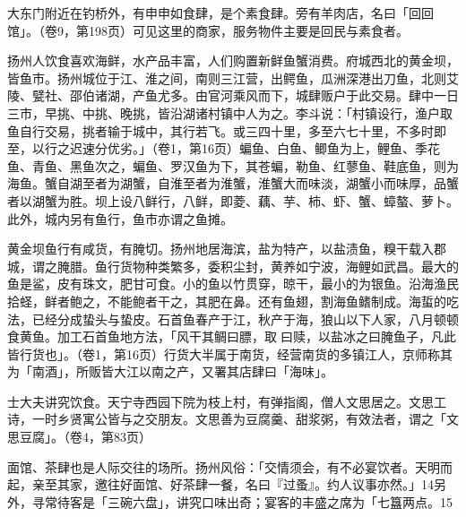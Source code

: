 大东门附近在钓桥外，有申申如食肆，是个素食肆。旁有羊肉店，名曰「回回馆」。（卷9，第198页）可见这里的商家，服务物件主要是回民与素食者。

\vfill
\begin{BookNotes}
\end{BookNotes}

扬州人饮食喜欢海鲜，水产品丰富，人们购置新鲜鱼蟹消费。府城西北的黄金坝，皆鱼市。扬州城位于江、淮之间，南则三江营，出鳄鱼，瓜洲深港出刀鱼，北则艾陵、甓社、邵伯诸湖，产鱼尤多。由官河乘风而下，城肆贩户于此交易。肆中一日三市，早挑、中挑、晚挑，皆沿湖诸村镇中人为之。李斗说：「村镇设行，渔户取鱼自行交易，挑者输于城中，其行若飞。或三四十里，多至六七十里，不多时即至，以行之迟速分优劣。」（卷1，第16页）蝙鱼、白鱼、鲫鱼为上，鲤鱼、季花鱼、青鱼、黑鱼次之，蝙鱼、罗汉鱼为下，其苍蝙，勒鱼、红蓼鱼、鞋底鱼，则为海鱼。蟹自湖至者为湖蟹，自淮至者为淮蟹，淮蟹大而味淡，湖蟹小而味厚，品蟹者以湖蟹为胜。坝上设八鲜行，八鲜，即菱、藕、芋、柿、虾、蟹、蟑螯、萝卜。此外，城内另有鱼行，鱼市亦谓之鱼摊。

黄金坝鱼行有咸货，有腌切。扬州地居海滨，盐为特产，以盐渍鱼，糗干载入郡城，谓之腌腊。鱼行货物种类繁多，委积尘封，黄养如宁波，海鲤如武昌。最大的鱼是鲨，皮有珠文，肥甘可食。小的鱼以竹贯穿，晾干，最小的为银鱼。沿海渔民拾蛏，鲜者鲍之，不能鲍者干之，其肥在鼻。还有鱼翅，割海鱼鳍制成。海蜇的吃法，已经分成蛰头与蛰皮。石首鱼春产于江，秋产于海，狼山以下人家，八月顿顿食黄鱼。加工石首鱼地方法，「风干其鲷曰膘，取𫗦曰赎，以盐冰之曰腌鱼子，凡此皆行货也」。（卷1，第16页）行货大半属于南货，经营南货的多镇江人，京师称其为「南酒」，所贩皆大江以南之产，又署其店肆曰「海味」。

士大夫讲究饮食。天宁寺西园下院为枝上村，有弹指阁，僧人文思居之。文思工诗，一时乡贤寓公皆与之交朋友。文思善为豆腐羹、甜浆粥，有效法者，谓之「文思豆腐」。（卷4，第83页）

面馆、茶肆也是人际交往的场所。扬州风俗：「交情须会，有不必宴饮者。天明而起，亲至其家，邀往好面馆、好茶肆一餐，名曰『过蚤』。约人议事亦然。」14另外，寻常待客是「三碗六盘」，讲究口味出奇；宴客的丰盛之席为「七簋两点。15

\vfill
\begin{BookNotes}
\end{BookNotes}

